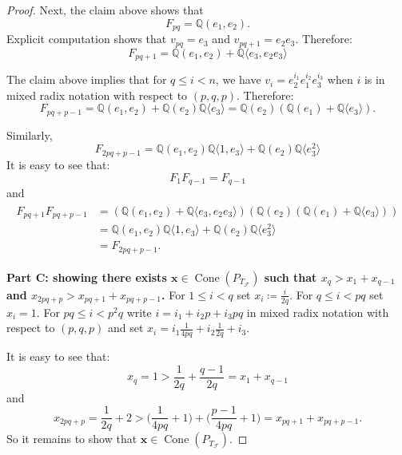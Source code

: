 \documentclass[letterpaper,10pt]{amsart}
\DeclareMathOperator{\Cone}{Cone}
\newcommand{\QQ}{\mathbb{Q}}      %
\newcommand{\la}{\langle}
\newcommand{\ra}{\rangle}
\newcommand{\cF}{\mathcal{F}}
\theoremstyle{definition}
\theoremstyle{remark}
\begin{document}
\begin{proof}
Next, the claim above shows that 
\begin{equation}
\label{eqn:p2q-fpq}
F_{pq} = \QQ(e_1,e_2).
\end{equation}
Explicit computation shows that $v_{pq} = e_3$ and $v_{pq + 1} = e_2e_3$. Therefore:
\begin{equation}
\label{eqn:p2q-fpq+1}
F_{pq+1} = \QQ(e_1,e_2) + \QQ \la  e_3, e_2e_3 \ra
\end{equation}

The claim above implies that for $q \leq i < n$, we have $v_i = e_2^{i_1}e_1^{i_2}e_3^{i_3}$ when $i$ is in mixed radix notation with respect to $(p,q,p)$. Therefore:
\begin{equation}
\label{eqn:p2q-fpq+p-1}
F_{pq+p-1} = \QQ(e_1,e_2) + \QQ(e_2) \QQ \la  e_3\ra = \QQ(e_2)( \QQ(e_1) + \QQ \la e_3 \ra).
\end{equation}

Similarly, 
\begin{equation}
\label{eqn:p2q-2pq+p-1}
F_{2pq+p-1} = \QQ(e_1, e_2) \QQ \la 1, e_3 \ra + \QQ(e_2) \QQ \la e_3^2 \ra
\end{equation}
It is easy to see that:
\begin{equation}
\label{eqn:f1fq-1}
F_1 F_{q-1} = F_{q-1} 
\end{equation}
and
\begin{gather}
\begin{aligned}
\label{eqn:fpq+1-pq+p-1}
F_{pq+1}F_{pq+p-1} &= (\QQ(e_1, e_2) + \QQ\la e_3, e_2e_3 \ra)(\QQ(e_2) (\QQ( e_1 ) + \QQ\la e_3 \ra))\\
&= \QQ( e_1, e_2) \QQ \la 1, e_3 \ra + \QQ(e_2)\QQ \la e_3^2 \ra\ \\
&= F_{2pq+p-1}.
\end{aligned}
\end{gather}

\noindent \textbf{Part C: showing there exists $\mathbf{x} \in \Cone(P_{T_{\cF}})$ such that $x_q > x_1 + x_{q-1}$ and $x_{2pq+p} > x_{pq + 1} + x_{pq + p - 1}$.}
For $1 \leq i < q$ set $x_i \coloneqq \frac{i}{2q}$. For $q \leq i < pq$ set $x_i = 1$. For $pq \leq i < p^2q$ write $i = i_1 + i_2p + i_3pq$ in mixed radix notation with respect to $(p,q,p)$ and set $x_i = i_1 \frac{1}{4pq} + i_2 \frac{1}{2q} + i_3$. 

It is easy to see that:
\[
	x_q = 1 > \frac{1}{2q} + \frac{q-1}{2q} = x_1 + x_{q-1}
\]
and
\[
	x_{2pq+p} = \frac{1}{2q} + 2 > \bigg (\frac{1}{4pq} + 1 \bigg) + \bigg (\frac{p-1}{4pq} + 1 \bigg) = x_{pq+1} + x_{pq + p - 1}.
\]
So it remains to show that $\mathbf{x} \in \Cone(P_{T_{\cF}})$.


\end{proof}
\end{document}
